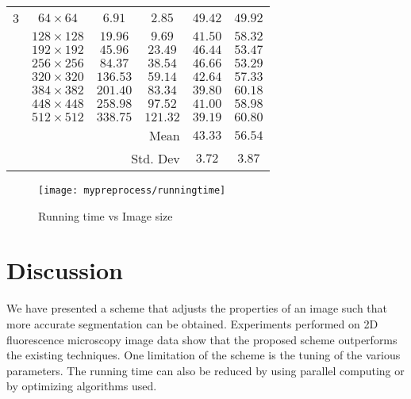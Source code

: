 \begin{definition}
\begin{table}[!h]
\begin{tabular}{|c|c|c|c|c|c|}
			3 		  	& $64\times64$ 	&$6.91$ &$2.85$ & $49.42$	&$49.92$ \\
			& $128\times128$ &$19.96$ &$9.69$ &$41.50$	&$58.32$ \\
			& $192\times192$ &$45.96$ &$23.49$ &$46.44$&$53.47$ \\
			& $256\times256$	&$84.37$ &$38.54$ &$46.66$&$53.29$ \\
			& $320\times320$ &$136.53$&$59.14$ &$42.64$&$57.33$ \\
			& $384\times382$ &$201.40$&$83.34$ &$39.80$&$60.18$ \\
			& $448\times448$ &$258.98$&$97.52$ &$41.00$&$58.98$ \\
			& $512\times512$ &$338.75$&$121.32$&$39.19$&$60.80$ \\
			\hline
			\multicolumn{4}{|r}{Mean} & $43.33$ & $56.54$ \\
			\multicolumn{4}{|r}{Std. Dev} & $3.72$ & $3.87$ \\
			\hline
		\end{tabular}
	\end{table}
	
	\begin{figure}[!h]
		\centering
		\texttt{[image: mypreprocess/runningtime]}
		\caption{Running time vs Image size}
		\label{fig:results_runningtime}
	\end{figure}
\end{definition}

\section{Discussion}
\label{sec:preprocessschemediscussion}

We have  presented a scheme that adjusts the properties of an image such that more accurate segmentation can be obtained. Experiments performed on 2D fluorescence microscopy image data show that the proposed scheme outperforms the existing techniques. One  limitation of the scheme  is the tuning of the various parameters. The running time can also be reduced by  using parallel computing or by optimizing algorithms used.
